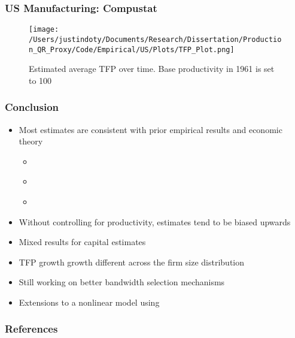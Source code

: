 \documentclass{beamer}
\begin{document}
\begin{frame}
\frametitle{US Manufacturing: Compustat}
\begin{figure}[ht]
\centering
\texttt{[image: /Users/justindoty/Documents/Research/Dissertation/Production\_QR\_Proxy/Code/Empirical/US/Plots/TFP\_Plot.png]}
\caption{Estimated average TFP over time. Base productivity in 1961 is set to 100}
\end{figure}
\end{frame}
\begin{frame}
\frametitle{Conclusion}
\begin{itemize}
	\item Most estimates are consistent with prior empirical results and economic theory
		\begin{itemize}
			\item \textcite{mert}
			\item \textcite{Holmes2008}
			\item \textcite{Rajan1999}
		\end{itemize}
	\item Without controlling for productivity, estimates tend to be biased upwards
	\item Mixed results for capital estimates
	\item TFP growth growth different across the firm size distribution
	\item Still working on better bandwidth selection mechanisms
	\item Extensions to a nonlinear model using \textcite{Arellano2016}
\end{itemize}
\end{frame}

\begin{frame}[allowframebreaks]
\frametitle{References}
\AtNextBibliography{\small}
\printbibliography
\end{frame}
\end{document}
